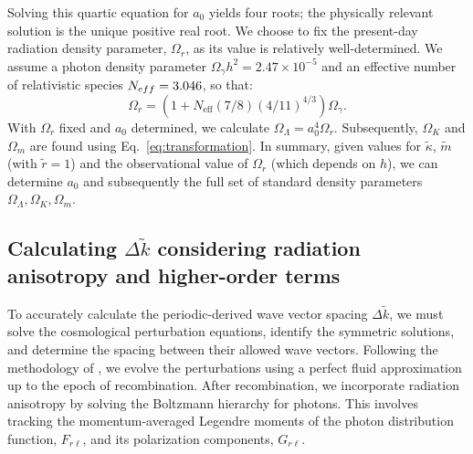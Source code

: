 \documentclass[%
 reprint,
 amsmath,amssymb,
 prd, %
]{revtex4-2}
\begin{document}
Solving this quartic equation for $a_0$ yields four roots; the physically relevant solution is the unique positive real root.
We choose to fix the present-day radiation density parameter, $\Omega_r$, as its value is relatively well-determined. We assume a photon density parameter $\Omega_\gamma h^2 = 2.47\times 10^{-5}$ and an effective number of relativistic species $N_{\mathrm\mathrm{eff}}=3.046$, so that: %
\begin{equation}
    \Omega_r= (1 + N_{\mathrm{eff}}(7/8)(4/11)^{4/3} ) \Omega_\gamma.
\end{equation}
With $\Omega_r$ fixed and $a_0$ determined, we calculate $\Omega_\Lambda=a_0^4\Omega_r$. Subsequently, $\Omega_K$ and $\Omega_m$ are found using Eq.~\eqref{eq:transformation}. %
In summary, given values for $\tilde \kappa$, $\tilde m$ (with $\tilde r=1$) and the observational value of $\Omega_r$ (which depends on $h$), we can determine $a_0$ and subsequently the full set of standard density parameters $\Omega_\Lambda, \Omega_K, \Omega_m$.

\subsection{Calculating $\Delta \tilde k$ considering radiation anisotropy and higher-order terms} %

To accurately calculate the periodic-derived wave vector spacing $\Delta \tilde k$, we must solve the cosmological perturbation equations, identify the symmetric solutions, and determine the spacing between their allowed wave vectors. %
Following the methodology of \cite{2022PhRvD.105h3515B}, we evolve the perturbations using a perfect fluid approximation up to the epoch of recombination. After recombination, we incorporate radiation anisotropy by solving the Boltzmann hierarchy for photons. This involves tracking the momentum-averaged Legendre moments of the photon distribution function, $F_{r\ell}$, and its polarization components, $G_{r\ell}$. %
\end{document}
